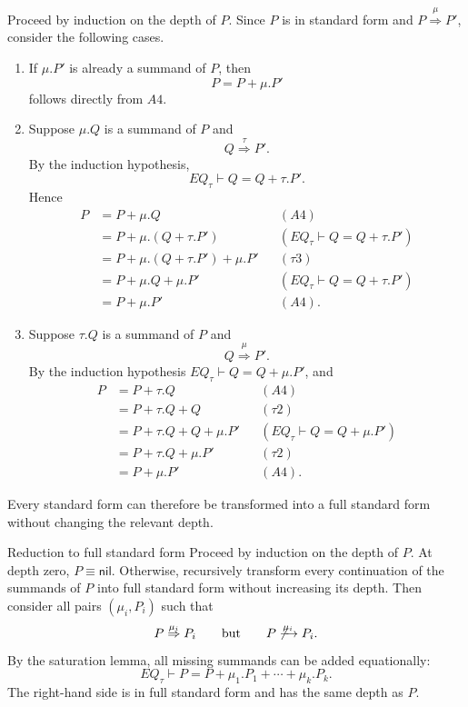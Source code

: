 \documentclass[a4paper]{article}
\newcommand{\nil}{\mathsf{nil}}
\newcommand{\trans}[1]{\xrightarrow{#1}}
\newcommand{\wtrans}[1]{\mathrel{\overset{#1}{\Rightarrow}}}
\begin{document}
\begin{snippetproof}{}
    Proceed by induction on the depth of \(P\). Since \(P\) is in standard form and \(P\wtrans{\mu}P'\), consider the following cases.
    \begin{enumerate}
        \item If \(\mu.P'\) is already a summand of \(P\), then
        \[
            P=P+\mu.P'
        \]
        follows directly from \(A4\).

        \item Suppose \(\mu.Q\) is a summand of \(P\) and
        \[
            Q\wtrans{\tau}P'.
        \]
        By the induction hypothesis,
        \[
            EQ_\tau\vdash Q=Q+\tau.P'.
        \]
        Hence
        \begin{align*}
            P&=P+\mu.Q &&(A4)\\
             &=P+\mu.(Q+\tau.P') &&(EQ_\tau\vdash Q=Q+\tau.P')\\
             &=P+\mu.(Q+\tau.P')+\mu.P' &&(\tau3)\\
             &=P+\mu.Q+\mu.P' &&(EQ_\tau\vdash Q=Q+\tau.P')\\
             &=P+\mu.P' &&(A4).
        \end{align*}

        \item Suppose \(\tau.Q\) is a summand of \(P\) and
        \[
            Q\wtrans{\mu}P'.
        \]
        By the induction hypothesis \(EQ_\tau\vdash Q=Q+\mu.P'\), and
        \begin{align*}
            P&=P+\tau.Q &&(A4)\\
             &=P+\tau.Q+Q &&(\tau2)\\
             &=P+\tau.Q+Q+\mu.P' &&(EQ_\tau\vdash Q=Q+\mu.P')\\
             &=P+\tau.Q+\mu.P' &&(\tau2)\\
             &=P+\mu.P' &&(A4).
        \end{align*}
    \end{enumerate}
\end{snippetproof}

Every standard form can therefore be transformed into a full standard form without changing the relevant depth.

\begin{snippetproof}{Reduction to full standard form}
    Proceed by induction on the depth of \(P\). At depth zero, \(P\equiv\nil\).
    Otherwise, recursively transform every continuation of the summands of \(P\) into full standard form without increasing its depth.
    Then consider all pairs \((\mu_i,P_i)\) such that
    \[
        P\wtrans{\mu_i}P_i
        \qquad\text{but}\qquad
        P\not\trans{\mu_i}P_i.
    \]
    By the saturation lemma, all missing summands can be added equationally:
    \[
        EQ_\tau\vdash
        P=P+\mu_1.P_1+\cdots+\mu_k.P_k.
    \]
    The right-hand side is in full standard form and has the same depth as \(P\).
\end{snippetproof}
\end{document}
